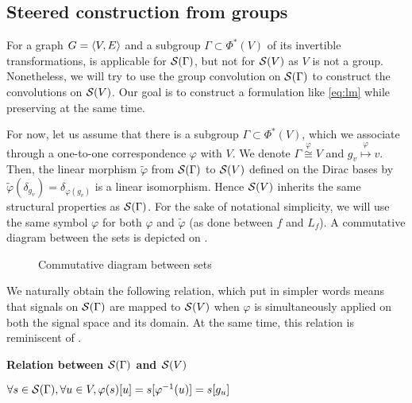 \subsection{Steered construction from groups}

For a graph $G = \langle V, E \rangle$ and a subgroup $\Gamma \subset \Phi^*(V)$ of its invertible transformations,  is applicable for $\mathcal{S}(\Gamma)$, but not for $\mathcal{S}(V)$ as $V$ is not a group. Nonetheless, we will try to use the group convolution on $\mathcal{S}(\Gamma)$ to construct the convolutions on $\mathcal{S}(V)$. Our goal is to construct a formulation like \eqref{eq:lm} while preserving  at the same time.

For now, let us assume that there is a subgroup $\Gamma \subset \Phi^*(V)$, which we associate through a one-to-one correspondence $\varphi$ with $V$. We denote $\Gamma \overset{\varphi}{\cong} V$ and $g_v \overset{\varphi}\mapsto v$. Then, the linear morphism $\widetilde\varphi$ from $\mathcal{S}(\Gamma)$ to $\mathcal{S}(V)$ defined on the Dirac bases by $\widetilde\varphi(\delta_{g_v}) = \delta_{\varphi(g_v)}$ is a linear isomorphism. Hence $\mathcal{S}(V)$ inherits the same structural properties as $\mathcal{S}(\Gamma)$. For the sake of notational simplicity, we will use the same symbol $\varphi$ for both $\varphi$ and $\widetilde\varphi$ (as done between $f$ and $L_f$). A commutative diagram between the sets is depicted on .

\begin{figure}[H]
\centering
{}%
\caption{Commutative diagram between sets}
\label{fig:iso}
\end{figure}

We naturally obtain the following relation, which put in simpler words means that signals on $\mathcal{S}(\Gamma)$ are mapped to $\mathcal{S}(V)$ when $\varphi$ is simultaneously applied on both the signal space and its domain. At the same time, this relation is reminiscent of .

\begin{lemma}\textbf{Relation between $\mathcal{S}(\Gamma)$ and $\mathcal{S}(V)$}\\
\centerline{$\forall s \in \mathcal{S}(\Gamma), \forall u \in V, \varphi(s)[u] = s[\varphi^{-1}(u)] = s[g_u]$}
\label{lem:outer}
\end{lemma}

